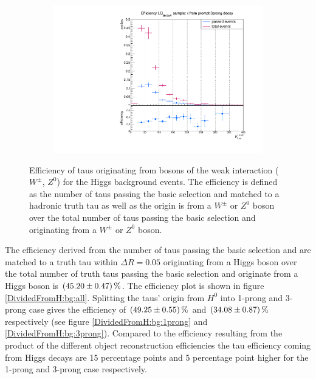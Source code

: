 \begin{figure}
\begin{subfigure}[t]{0.49\textwidth}
                \label{Dividedprompt:bg:1prong}
                \end{subfigure}
                \begin{subfigure}[t]{0.49\textwidth}
                \includegraphics[width=\textwidth]{figures/plots/ttH/Divided_prompt3prong.pdf}
                \label{Dividedprompt:bg:3prong}
                \end{subfigure}
\caption[Efficiency of taus originating from bosons of the weak interaction ($W^\pm$, $Z^0$) for the Higgs background events.]{Efficiency of taus originating from bosons of the weak interaction ($W^\pm$, $Z^0$) for the Higgs background events. The efficiency is defined as the number of taus passing the basic selection and matched to a hadronic truth tau as well as the origin is from a $W^\pm$ or $Z^0$ boson over the total number of taus passing the basic selection and originating from a $W^\pm$ or $Z^0$ boson.}
\label{Dividedprompt:bg:ttH}
\end{figure}
%
The efficiency derived from the number of taus passing the basic selection and are matched to a truth tau within $\Delta R=0.05$ originating from a Higgs boson over the total number of truth taus passing the basic selection and originate from a Higgs boson is $\SI{45.20\pm 0.47}{\percent}$. The efficiency plot is shown in figure \ref{DividedFromH:bg:all}. Splitting the taus' origin from $H^0$ into 1-prong and 3-prong case gives the efficiency of $\SI{49.25\pm 0.55}{\percent}$ and $\SI{34.08\pm 0.87}{\percent}$ respectively (see figure \ref{DividedFromH:bg:1prong} and \ref{DividedFromH:bg:3prong}). Compared to the efficiency resulting from the product of the different object reconstruction efficiencies the tau efficiency coming from Higgs decays are 15 percentage points and 5 percentage point higher for the 1-prong and 3-prong case respectively.\par    
